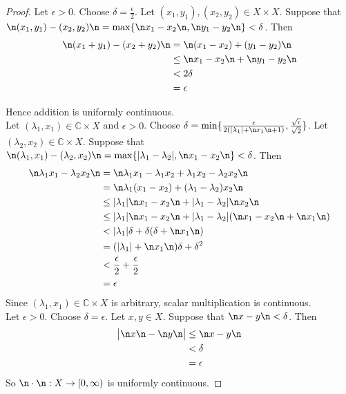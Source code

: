 \documentclass[12pt]{amsart}
\newcommand{\del}{\delta}
\newcommand{\lam}{\lambda}
\newcommand{\ep}{\epsilon}
\newcommand{\C}{\mathbb{C}}
\newcommand{\Rg}{[0,\infty)}
\begin{document}
\begin{proof}
	Let $\ep > 0$. Choose $\del = \frac{\ep}{2}$. Let $(x_1,y_1), (x_2,y_2) \in X \times X$. Suppose that $\n (x_1,y_1)-(x_2,y_2) \n  = \max\{\n x_1-x_2 \n , \n y_1 - y_2 \n \} < \del$. Then 
	\begin{align*}
		\n (x_1 + y_1) - (x_2+y_2) \n
		&= \n (x_1-x_2) + (y_1-y_2) \n\\
		& \leq \n  x_1-x_2 \n + \n y_1-y_2 \n\\
		& < 2\del \\
		&= \ep
	\end{align*} 
	
	Hence addition is uniformly continuous. \vspace{1cm}\\ Let $(\lam_1,x_1) \in \C \times X$ and $\ep >0$. Choose $\del = \min\{\frac{\ep}{2(\vert \lam_1 \vert + \n x_1 \n + 1)}, \frac{\sqrt{\ep}}{\sqrt{2}}\}$. Let $(\lam_2, x_2) \in \C \times X$. Suppose that $\n (\lam_1, x_1)-(\lam_2,x_2) \n  = \max\{\vert \lam_1-\lam_2 \vert , \n x_1 - x_2 \n \} < \del$. Then 
	\begin{align*}
		\n \lam_1x_1 - \lam_2x_2 \n
		&= \n \lam_1x_1 - \lam_1x_2 + \lam_1x_2- \lam_2x_2 \n\\
		&= \n \lam_1(x_1-x_2) + (\lam_1-\lam_2)x_2 \n \\
		& \leq \vert \lam_1 \vert \n  x_1-x_2 \n + \vert \lam_1-\lam_2 \vert \n x_2\n\\
		& \leq \vert \lam_1 \vert  \n  x_1-x_2 \n + \vert \lam_1-\lam_2 \vert (\n x_1 -x_2\n + \n x_1\n )\\
		& < \vert \lam_1 \vert \del  +  \del( \del + \n x_1 \n)\\
		&= (\vert \lam_1 \vert + \n x_1 \n) \del + \del^2 \\
		&< \frac{\ep}{2}+ \frac{\ep}{2}\\
		&= \ep
	\end{align*}
	Since $(\lam_1, x_1) \in \C \times X$ is arbitrary, scalar multiplication is continuous. \vspace{1cm} \\ Let $\ep > 0$. Choose $\del = \ep$. Let $x,y \in X$. Suppose that $\n x-y \n < \del$. Then 
	\begin{align*}
		\big \vert \n x \n - \n y \n \big  \vert
		& \leq \n x - y \n\\
		&< \del\\
		&=\ep
	\end{align*}  
	So $\n \cdot \n : X \rightarrow \Rg$ is uniformly continuous.
\end{proof}
\end{document}
